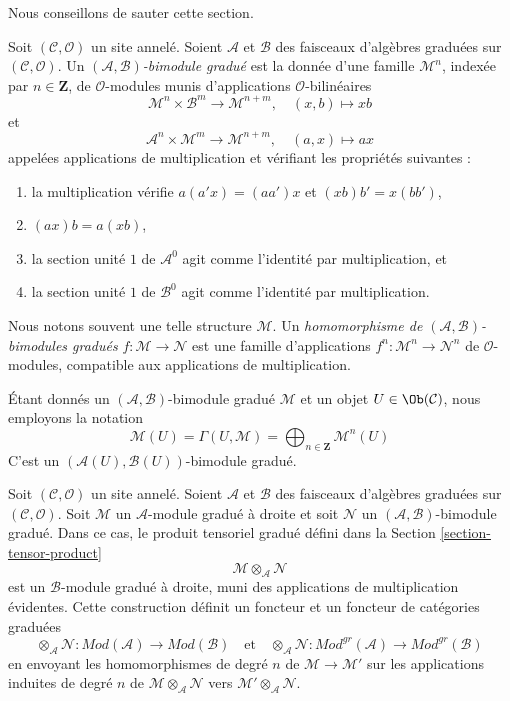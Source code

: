 \noindent
Nous conseillons de sauter cette section.

\begin{definition}
\label{definition-bimodule}
Soit $(\mathcal{C}, \mathcal{O})$ un site annelé. Soient $\mathcal{A}$
et $\mathcal{B}$ des faisceaux d'algèbres graduées sur
$(\mathcal{C}, \mathcal{O})$. Un
{\it $(\mathcal{A}, \mathcal{B})$-bimodule gradué}
est la donnée d'une famille $\mathcal{M}^n$, indexée par
$n \in \mathbf{Z}$, de $\mathcal{O}$-modules munis d'applications
$\mathcal{O}$-bilinéaires
$$
\mathcal{M}^n \times \mathcal{B}^m \to \mathcal{M}^{n + m},\quad
(x, b) \longmapsto xb
$$
et
$$
\mathcal{A}^n \times \mathcal{M}^m \to \mathcal{M}^{n + m},\quad
(a, x) \longmapsto ax
$$
appelées applications de multiplication et vérifiant les propriétés suivantes :
\begin{enumerate}
\item la multiplication vérifie $a(a'x) = (aa')x$ et $(xb)b' = x(bb')$,
\item $(ax)b = a(xb)$,
\item la section unité $1$ de $\mathcal{A}^0$ agit comme l'identité par
multiplication, et
\item la section unité $1$ de $\mathcal{B}^0$ agit comme l'identité par
multiplication.
\end{enumerate}
Nous notons souvent une telle structure $\mathcal{M}$.
Un {\it homomorphisme de $(\mathcal{A}, \mathcal{B})$-bimodules gradués}
$f : \mathcal{M} \to \mathcal{N}$ est une famille d'applications
$f^n : \mathcal{M}^n \to \mathcal{N}^n$ de $\mathcal{O}$-modules,
compatible aux applications de multiplication.
\end{definition}

\noindent
Étant donnés un $(\mathcal{A}, \mathcal{B})$-bimodule gradué $\mathcal{M}$
et un objet $U \in \Ob(\mathcal{C})$, nous employons la notation
$$
\mathcal{M}(U) =
\Gamma(U, \mathcal{M}) =
\bigoplus\nolimits_{n \in \mathbf{Z}} \mathcal{M}^n(U)
$$
C'est un $(\mathcal{A}(U), \mathcal{B}(U))$-bimodule gradué.

\medskip\noindent
Soit $(\mathcal{C}, \mathcal{O})$ un site annelé. Soient $\mathcal{A}$
et $\mathcal{B}$ des faisceaux d'algèbres graduées sur
$(\mathcal{C}, \mathcal{O})$. Soit $\mathcal{M}$ un
$\mathcal{A}$-module gradué à droite et soit $\mathcal{N}$ un
$(\mathcal{A}, \mathcal{B})$-bimodule gradué. Dans ce cas, le produit
tensoriel gradué défini dans la Section \ref{section-tensor-product}
$$
\mathcal{M} \otimes_\mathcal{A} \mathcal{N}
$$
est un $\mathcal{B}$-module gradué à droite, muni des applications de
multiplication évidentes. Cette construction définit un foncteur et un
foncteur de catégories graduées
$$
\otimes_\mathcal{A} \mathcal{N} :
\textit{Mod}(\mathcal{A})
\longrightarrow
\textit{Mod}(\mathcal{B})
\quad\text{et}\quad
\otimes_\mathcal{A} \mathcal{N} :
\textit{Mod}^{gr}(\mathcal{A})
\longrightarrow
\textit{Mod}^{gr}(\mathcal{B})
$$
en envoyant les homomorphismes de degré $n$ de
$\mathcal{M} \to \mathcal{M}'$ sur les applications induites de degré $n$
de $\mathcal{M} \otimes_\mathcal{A} \mathcal{N}$ vers
$\mathcal{M}' \otimes_\mathcal{A} \mathcal{N}$.

